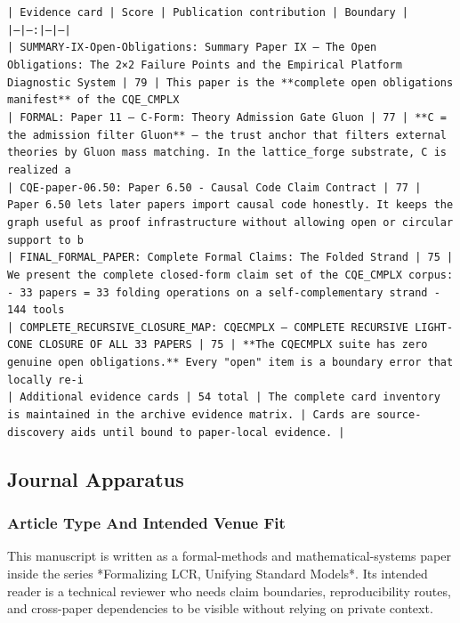 \documentclass[11pt]{article}
\begin{document}
\noindent\texttt{| Evidence card | Score | Publication contribution | Boundary |}\\
\noindent\texttt{|---|---:|---|---|}\\
\noindent\texttt{| SUMMARY-IX-Open-Obligations: Summary Paper IX — The Open Obligations: The 2×2 Failure Points and the Empirical Platform Diagnostic System | 79 | This paper is the **complete open obligations manifest** of the CQE\_CMPLX}\\
\noindent\texttt{| FORMAL: Paper 11 — C-Form: Theory Admission Gate Gluon | 77 | **C = the admission filter Gluon** — the trust anchor that filters external theories by Gluon mass matching. In the lattice\_forge substrate, C is realized a}\\
\noindent\texttt{| CQE-paper-06.50: Paper 6.50 - Causal Code Claim Contract | 77 | Paper 6.50 lets later papers import causal code honestly. It keeps the graph useful as proof infrastructure without allowing open or circular support to b}\\
\noindent\texttt{| FINAL\_FORMAL\_PAPER: Complete Formal Claims: The Folded Strand | 75 | We present the complete closed-form claim set of the CQE\_CMPLX corpus: - 33 papers = 33 folding operations on a self-complementary strand - 144 tools}\\
\noindent\texttt{| COMPLETE\_RECURSIVE\_CLOSURE\_MAP: CQECMPLX — COMPLETE RECURSIVE LIGHT-CONE CLOSURE OF ALL 33 PAPERS | 75 | **The CQECMPLX suite has zero genuine open obligations.** Every "open" item is a boundary error that locally re-i}\\
\noindent\texttt{| Additional evidence cards | 54 total | The complete card inventory is maintained in the archive evidence matrix. | Cards are source-discovery aids until bound to paper-local evidence. |}\\

\subsection*{Journal Apparatus}

\subsubsection*{Article Type And Intended Venue Fit}

This manuscript is written as a formal-methods and mathematical-systems paper
inside the series *Formalizing LCR, Unifying Standard Models*. Its intended
reader is a technical reviewer who needs claim boundaries, reproducibility
routes, and cross-paper dependencies to be visible without relying on private
context.
\end{document}

